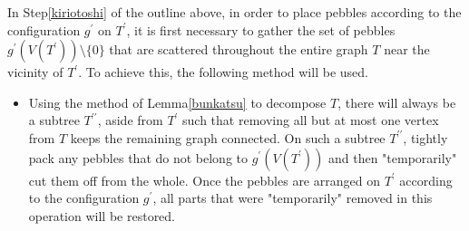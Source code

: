 \documentclass[letter,11pt]{article}
\theoremstyle{definition}
\theoremstyle{definition}
\newcommand{\1}{\boldmath$~1~$\unboldmath}
\newcommand{\tume}{\hspace*{0.2em}}
\begin{document}
In Step\tume\ref{kiriotoshi} of the outline above, in order to place pebbles according to the configuration $g^{\prime}$ on $T^{\prime}$, it is first necessary to gather the set of pebbles $g^{\prime}(V(T^{\prime}))\setminus\{0\}$ that are scattered throughout the entire graph $T$ near the vicinity of $T^{\prime}$. To achieve this, the following method will be used.
\begin{itemize}
\item{Using the method of Lemma\tume\ref{bunkatsu} to decompose $T$, there will always be a subtree $T^{\prime\prime}$, aside from $T^{\prime}$ such that removing all but at most one vertex from $T$ keeps the remaining graph connected. On such a subtree $T^{\prime\prime}$, tightly pack any pebbles that do not belong to $g^{\prime}(V(T^{\prime}))$ and then "temporarily" cut them off from the whole. Once the pebbles are arranged on $T^{\prime}$ according to the configuration $g^{\prime}$, all parts that were "temporarily" removed in this operation will be restored.
}
\end{itemize}

\end{document}
